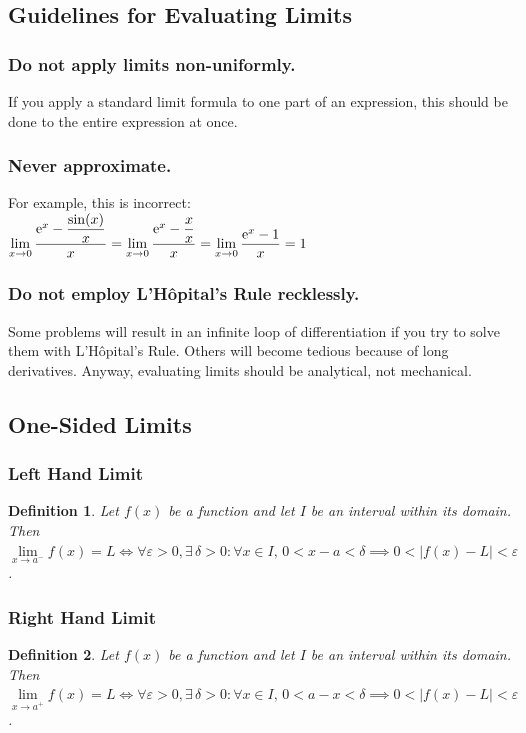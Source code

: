 \documentclass[14]{article}
\newtheorem{define}{Definition}
\theoremstyle{definition}
\theoremstyle{case}
\begin{document}
\subsection{Guidelines for Evaluating Limits}
\subsubsection*{Do not apply limits non-uniformly.}
If you apply a standard limit formula to one part of an expression, this should be done to the entire expression at once.
\subsubsection*{Never approximate.}
For example, this is incorrect:\\
\textcolor{red}{$\lim\limits_{x \to 0} \dfrac{{\rm e}^x - \dfrac{\sin(x)}{x}}{x} = \lim\limits_{x \to 0} \dfrac{{\rm e}^x - \dfrac{x}{x}}{x} = \lim\limits_{x \to 0} \dfrac{{\rm e}^x - 1}{x} = 1$}
\subsubsection*{Do not employ L'Hôpital's Rule recklessly.}
Some problems will result in an infinite loop of differentiation if you try to solve them with L'Hôpital's Rule. Others will become tedious because of long derivatives. Anyway, evaluating limits should be analytical, not mechanical.
\pagebreak
\subsection{One-Sided Limits}
\subsubsection{Left Hand Limit}
\begin{define}
Let $f(x)$ be a function and let $I$ be an interval within its domain.\\
Then $\lim\limits_{x \to a^-} f(x) = L \iff \forall \varepsilon > 0, \exists \, \delta > 0 : \forall x \in I,\, 0 < x - a < \delta \implies 0 < |f(x) - L| < \varepsilon$.
\end{define}
\subsubsection{Right Hand Limit}
\begin{define}
Let $f(x)$ be a function and let $I$ be an interval within its domain.\\
Then $\lim\limits_{x \to a^+} f(x) = L \iff \forall \varepsilon > 0, \exists \, \delta > 0 : \forall x \in I,\, 0 < a - x < \delta \implies 0 < |f(x) - L| < \varepsilon$.
\end{define}
\end{document}
